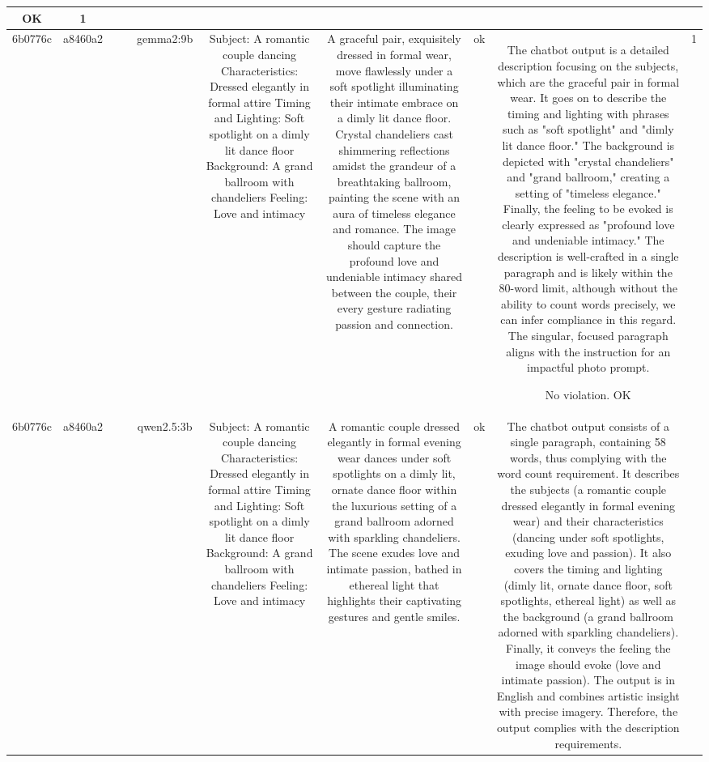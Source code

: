 \begin{table}[h!]
\begin{tabular}{|c|c|c|c|c|c|c|c|c|c|}
OK & 1\\
\hline
6b0776c & a8460a2 &  &  & gemma2:9b & Subject: A romantic couple dancing  
Characteristics: Dressed elegantly in formal attire  
Timing and Lighting: Soft spotlight on a dimly lit dance floor  
Background: A grand ballroom with chandeliers  
Feeling: Love and intimacy & A graceful pair, exquisitely dressed in formal wear, move flawlessly under a soft spotlight illuminating their intimate embrace on a dimly lit dance floor.  Crystal chandeliers cast shimmering reflections amidst the grandeur of a breathtaking ballroom, painting the scene with an aura of timeless elegance and romance. The image should capture the profound love and undeniable intimacy shared between the couple, their every gesture radiating passion and connection. 


 & ok & The chatbot output is a detailed description focusing on the subjects, which are the graceful pair in formal wear. It goes on to describe the timing and lighting with phrases such as "soft spotlight" and "dimly lit dance floor." The background is depicted with "crystal chandeliers" and "grand ballroom," creating a setting of "timeless elegance." Finally, the feeling to be evoked is clearly expressed as "profound love and undeniable intimacy." The description is well-crafted in a single paragraph and is likely within the 80-word limit, although without the ability to count words precisely, we can infer compliance in this regard. The singular, focused paragraph aligns with the instruction for an impactful photo prompt. 

No violation. 
OK & 1\\
\hline
6b0776c & a8460a2 &  &  & qwen2.5:3b & Subject: A romantic couple dancing  
Characteristics: Dressed elegantly in formal attire  
Timing and Lighting: Soft spotlight on a dimly lit dance floor  
Background: A grand ballroom with chandeliers  
Feeling: Love and intimacy & A romantic couple dressed elegantly in formal evening wear dances under soft spotlights on a dimly lit, ornate dance floor within the luxurious setting of a grand ballroom adorned with sparkling chandeliers. The scene exudes love and intimate passion, bathed in ethereal light that highlights their captivating gestures and gentle smiles. & ok & The chatbot output consists of a single paragraph, containing 58 words, thus complying with the word count requirement. It describes the subjects (a romantic couple dressed elegantly in formal evening wear) and their characteristics (dancing under soft spotlights, exuding love and passion). It also covers the timing and lighting (dimly lit, ornate dance floor, soft spotlights, ethereal light) as well as the background (a grand ballroom adorned with sparkling chandeliers). Finally, it conveys the feeling the image should evoke (love and intimate passion). The output is in English and combines artistic insight with precise imagery. Therefore, the output complies with the description requirements.


\end{tabular}
\end{table}
